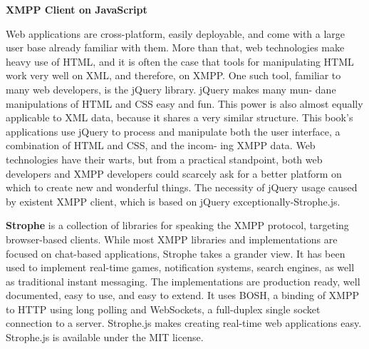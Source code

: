     \textbf{XMPP Client on JavaScript}

	   Web applications are cross-platform, easily deployable, and come with a large user base already familiar with them. More than that, web technologies make heavy use of HTML, and it is often the case that tools for manipulating HTML work very well on XML, and therefore, on XMPP. One such tool, familiar to many web developers, is the jQuery library. jQuery makes many mun- dane manipulations of HTML and CSS easy and fun. This power is also almost equally applicable to XML data, because it shares a very similar structure. This book’s applications use jQuery to process and manipulate both the user interface, a combination of HTML and CSS, and the incom- ing XMPP data. Web technologies have their warts, but from a practical standpoint, both web developers and XMPP developers could scarcely ask for a better platform on which to create new and wonderful things. The necessity of jQuery usage caused by existent XMPP client, which is based on jQuery exceptionally-Strophe.js.

    \textbf{Strophe} is a collection of libraries for speaking the XMPP protocol, targeting browser-based clients. While most XMPP libraries and implementations are focused on chat-based applications, Strophe takes a grander view. It has been used to implement real-time games, notification systems, search engines, as well as traditional instant messaging. The implementations are production ready, well documented, easy to use, and easy to extend. It uses BOSH, a binding of XMPP to HTTP using long polling and WebSockets, a full-duplex single socket connection to a server. Strophe.js makes creating real-time web applications easy. Strophe.js is available under the MIT license.


